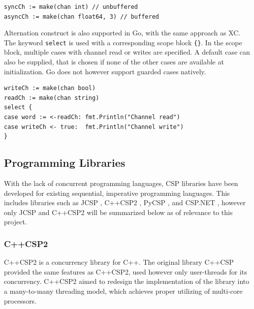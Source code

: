 \noindent\begin{minipage}{\textwidth}
\begin{lstlisting}[style={CustomGo},frame={},numbers={none},xleftmargin={4em}]
syncCh := make(chan int) // unbuffered
asyncCh := make(chan float64, 3) // buffered
\end{lstlisting}
\end{minipage}

Alternation construct is also supported in Go, with the same approach as XC. The keyword \texttt{select} is used with a corresponding scope block \texttt{\{\}}. In the scope block, multiple cases with channel read or writes are specified. A default case can also be supplied, that is chosen if none of the other cases are available at initialization. Go does not however support guarded cases natively.

\noindent\begin{minipage}{\textwidth}
\begin{lstlisting}[style={CustomGo},frame={},numbers={none},xleftmargin={4em}]
writeCh := make(chan bool)
readCh := make(chan string)
select {
case word := <-readCh: fmt.Println("Channel read")
case writeCh <- true:  fmt.Println("Channel write")
}
\end{lstlisting}
\end{minipage}


\subsection{Programming Libraries}
\label{subsec:csp_prog_lib}

With the lack of concurrent programming languages, CSP libraries have been developed for existing sequential, imperative programming languages. This includes libraries such as JCSP \citep{jcsp}, C++CSP2 \citep{c++csp2}, PyCSP \citep{pycsp}, and CSP.NET \citep{cspnet}, however only JCSP and C++CSP2 will be summarized below as of relevance to this project.


\subsubsection{C++CSP2}
\label{sssec:c++csp2}

C++CSP2 \citep{c++csp2} is a concurrency library for C++. The original library C++CSP \citep{c++csp} provided the same features as C++CSP2, used however only user-threads for its concurrency. C++CSP2 aimed to redesign the implementation of the library into a many-to-many threading model, which achieves proper utilizing of multi\hyp{}core processors. 

